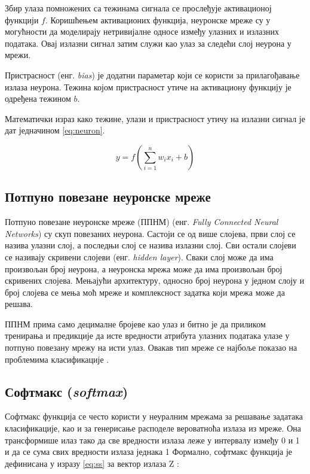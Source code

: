 Збир улаза помножених са тежинама сигнала се прослеђује активационој функцији $f$. 
Коришћењем активационих функција, неуронске мреже су у могућности да моделирају нетривијалне односе између улазних и излазних података. 
Овај излазни сигнал затим служи као улаз за следећи слој неурона у мрежи.
\newline

Пристрасност (енг. \textit{bias}) је додатни параметар који се користи за прилагођавање излаза неурона. 
Тежина којом пристрасност утиче на активациону функцију је одређена тежином $b$.
\newline

Математички израз како тежине, улази и пристрасност утичу на излазни сигнал је дат једначином \ref{eq:neuron}.

\begin{equation}
    y = f\left(\sum_{i=1}^{n} w_i x_i + b\right)
    \label{eq:neuron}
\end{equation}

\subsection{Потпуно повезане неуронске мреже}
\label{sec:41}

Потпуно повезане неуронске мреже (ППНМ) (енг. \textit{Fully Connected Neural Networks}) су скуп повезаних неурона. 
Састоји се од више слојева, први слој се назива улазни слој, а последњи слој се назива излазни слој. 
Сви остали слојеви се називају скривени слојеви (енг. \textit{hidden layer}).
Сваки слој може да има произвољан број неурона, а неуронска мрежа може да има произвољан број скривених слојева. 
Мењајући архитектуру, односно број неурона у једном слоју и број слојева се мења моћ мреже и комплексност задатка који мрежа може да решава.

ППНМ прима само децималне бројеве као улаз и битно је да приликом тренирања и предикције да исте вредности атрибута улазних података улазе у потпуно повезану мрежу на исти улаз.
Овакав тип мреже се најбоље показао на проблемима класификације \cite{noauthor_artificial_2023}.

\subsection{Софтмакс (\textit{softmax})}

Софтмакс функција се често користи у неуралним мрежама за решавање задатака класификације, као и за генерисање расподеле вероватноћа излаза из мреже. 
Она трансформише илаз тако да све вредности излаза леже у интервалу између 0 и 1 и да се сума свих вредности излаза једнака 1 
Формално, софтмакс функција је дефинисана у изразу \ref{eq:ss} за вектор излаза Z :
\newline

